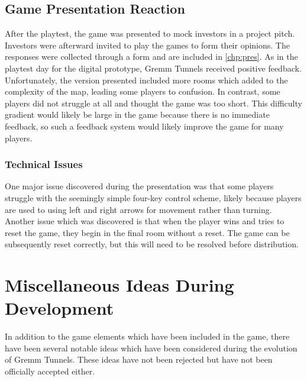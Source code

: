 \documentclass{scrreprt}
\begin{document}
			\subsection{Game Presentation Reaction}
				After the playtest, the game was presented to mock investors in a project pitch. Investors were afterward invited to play the games to form their opinions. The responses were collected through a form and are included in \autoref{chp:pres}. As in the playtest day for the digital prototype, Gremm Tunnels received positive feedback. Unfortunately, the version presented included more rooms which added to the complexity of the map, leading some players to confusion. In contrast, some players did not struggle at all and thought the game was too short. This difficulty gradient would likely be large in the game because there is no immediate feedback, so such a feedback system would likely improve the game for many players.
				
				\subsubsection{Technical Issues}
					One major issue discovered during the presentation was that some players struggle with the seemingly simple four-key control scheme, likely because players are used to using left and right arrows for movement rather than turning. Another issue which was discovered is that when the player wins and tries to reset the game, they begin in the final room without a reset. The game can be subsequently reset correctly, but this will need to be resolved before distribution.
		
		\section{Miscellaneous Ideas During Development}
			In addition to the game elements which have been included in the game, there have been several notable ideas which have been considered during the evolution of Gremm Tunnels. These ideas have not been rejected but have not been officially accepted either.
			
\end{document}
